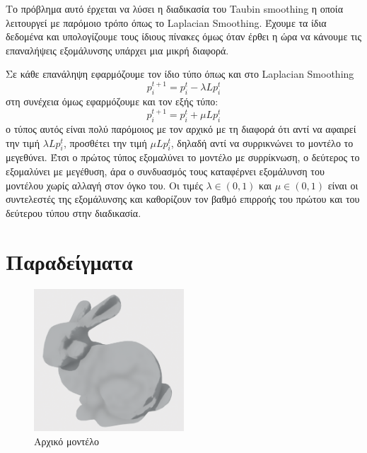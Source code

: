 \documentclass{article}
\begin{document}
Το πρόβλημα αυτό έρχεται να λύσει η διαδικασία του Taubin smoothing η οποία λειτουργεί
με παρόμοιο τρόπο όπως το Laplacian Smoothing. Έχουμε τα ίδια δεδομένα και υπολογίζουμε
τους ίδιους πίνακες όμως όταν έρθει η ώρα να κάνουμε τις επαναλήψεις εξομάλυνσης
υπάρχει μια μικρή διαφορά.

Σε κάθε επανάληψη εφαρμόζουμε τον ίδιο τύπο όπως και στο Laplacian Smoothing
\[p_i^{t+1} = p_i^{t} - \lambda Lp_i^{t}\]
στη συνέχεια όμως εφαρμόζουμε και τον εξής τύπο:
\[p_i^{t+1} = p_i^{t} + \mu Lp_i^{t}\]
ο τύπος αυτός είναι πολύ παρόμοιος με τον αρχικό με τη διαφορά ότι αντί να αφαιρεί την
τιμή $\lambda Lp_i^{t}$, προσθέτει την τιμή $\mu Lp_i^{t}$, δηλαδή αντί να συρρικνώνει
το μοντέλο το μεγεθύνει. Έτσι ο πρώτος τύπος εξομαλύνει το μοντέλο με συρρίκνωση, ο
δεύτερος το εξομαλύνει με μεγέθυση, άρα ο συνδυασμός τους καταφέρνει εξομάλυνση του
μοντέλου χωρίς αλλαγή στον όγκο του. Οι τιμές $\lambda \in (0, 1)$ και $\mu \in (0, 1)$
είναι οι συντελεστές της εξομάλυνσης και καθορίζουν τον βαθμό επιρροής του πρώτου και
του δεύτερου τύπου στην διαδικασία.

\section{Παραδείγματα}

\begin{figure}[h]
	\center
	\includegraphics[width=0.5\textwidth]{"1.png"}
	\caption{Αρχικό μοντέλο}
\end{figure}
\end{document}
